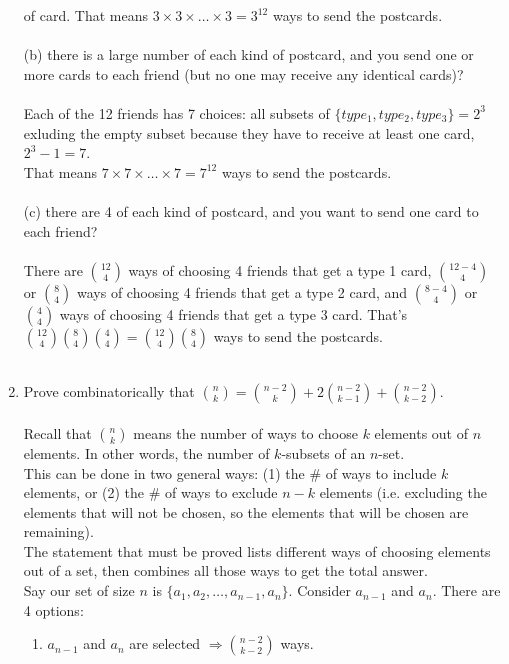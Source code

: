 \documentclass[10pt,a4paper,final]{article}
\begin{document}
\begin{enumerate}
of card. That means $3 \times 3 \times \dots \times 3 = 3^{12}$ ways to send the postcards.\\
\\ 
(b) there is a large number of each kind of postcard,
and you send one or more cards to each friend
(but no one may receive any identical cards)?\\
\\
Each of the 12 friends has 7 choices: all subsets of $\{type_1, type_2, type_3\} = 2^3$
exluding the empty subset because they have to receive at least one card, $2^3-1 = 7$.\\
That means $7 \times 7 \times \dots \times 7 = 7^{12}$ ways to send the postcards.\\
\\
(c) there are 4 of each kind of postcard, and you want to send one card to each friend?\\
\\
There are $12 \choose 4$ ways of choosing 4 friends that get a type 1 card,
$12-4 \choose 4$ or $8 \choose 4$ ways of choosing 4 friends that get a type 2 card,
and $8-4 \choose 4$ or $4 \choose 4$ ways of choosing 4 friends that get a type 3 card.
That's $\binom{12}{4} \binom{8}{4} \binom{4}{4} = \binom{12}{4} \binom{8}{4}$
ways to send the postcards.\\
\\
\item %
Prove combinatorically that
$\binom{n}{k} = \binom{n-2}{k} + 2 \binom{n-2}{k-1} + \binom{n-2}{k-2}$.\\
\\
Recall that $n \choose k$ means the number of ways to choose $k$ elements out of $n$ elements.
In other words, the number of $k$-subsets of an $n$-set.\\
This can be done in two general ways:
(1) the \# of ways to include $k$ elements,
or (2) the \# of ways to exclude $n-k$ elements
(i.e. excluding the elements that will not be chosen, so the
elements that will be chosen are remaining).\\
The statement that must be proved lists different ways of choosing elements
out of a set, then combines all those ways to get the total answer.\\
Say our set of size $n$ is $\{a_1, a_2, \dots, a_{n-1}, a_n\}$.
Consider $a_{n-1}$ and $a_n$. There are 4 options:
\begin{enumerate}
\item $a_{n-1}$ and $a_n$ are selected $\Rightarrow \binom{n-2}{k-2}$ ways.\\

\end{enumerate}
\end{enumerate}
\end{document}
